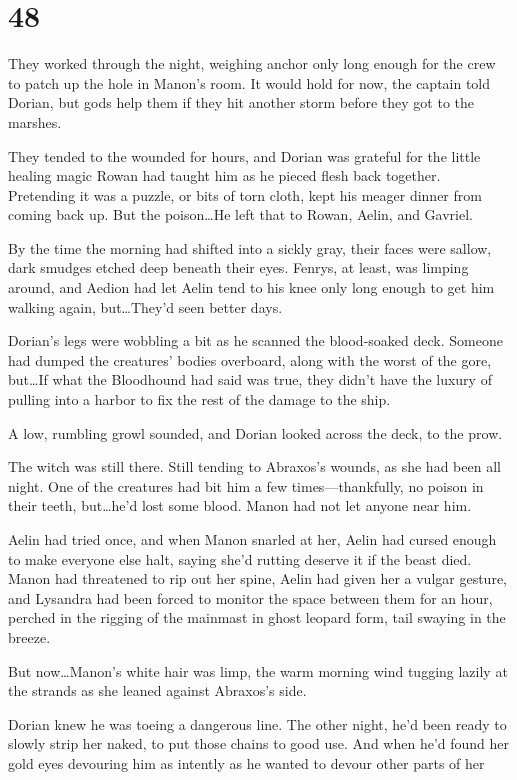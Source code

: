 
\chapter{48}

They worked through the night, weighing anchor only long enough for the crew to patch up the hole in Manon's room.
It would hold for now, the captain told Dorian, but gods help them if they hit another storm before they got to the marshes.

They tended to the wounded for hours, and Dorian was grateful for the little healing magic Rowan had taught him as he pieced flesh back together.
Pretending it was a puzzle, or bits of torn cloth, kept his meager dinner from coming back up.
But the poison\ldots He left that to Rowan, Aelin, and Gavriel.

By the time the morning had shifted into a sickly gray, their faces were sallow, dark smudges etched deep beneath their eyes.
Fenrys, at least, was limping around, and Aedion had let Aelin tend to his knee only long enough to get him walking again, but\ldots They'd seen better days.

Dorian's legs were wobbling a bit as he scanned the blood-soaked deck.
Someone had dumped the creatures' bodies overboard, along with the worst of the gore, but\ldots If what the Bloodhound had said was true, they didn't have the luxury of pulling into a harbor to fix the rest of the damage to the ship.

A low, rumbling growl sounded, and Dorian looked across the deck, to the prow.

The witch was still there.
Still tending to Abraxos's wounds, as she had been all night.
One of the creatures had bit him a few times---thankfully, no poison in their teeth, but\ldots he'd lost some blood.
Manon had not let anyone near him.

Aelin had tried once, and when Manon snarled at her, Aelin had cursed enough to make everyone else halt, saying she'd rutting deserve it if the beast died.
Manon had threatened to rip out her spine, Aelin had given her a vulgar gesture, and Lysandra had been forced to monitor the space between them for an hour, perched in the rigging of the mainmast in ghost leopard form, tail swaying in the breeze.

But now\ldots Manon's white hair was limp, the warm morning wind tugging lazily at the strands as she leaned against Abraxos's side.

Dorian knew he was toeing a dangerous line.
The other night, he'd been ready to slowly strip her naked, to put those chains to good use.
And when he'd found her gold eyes devouring him as intently as he wanted to devour other parts of her 

